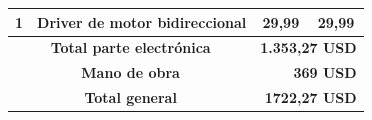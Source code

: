 \begin{appendices}
\begin{table}[t]
\begin{tabular}{clcc}
\multicolumn{1}{|c|}{1}                 & \multicolumn{1}{l|}{Driver de motor bidireccional}                      & \multicolumn{1}{c|}{29,99}              & \multicolumn{1}{c|}{29,99}              \\ \hline
\multicolumn{2}{|c|}{\textbf{Total parte electrónica}}                                                            & \multicolumn{2}{r|}{\textbf{1.353,27 USD}}                                        \\ \hline
\multicolumn{2}{|c|}{\textbf{Mano de obra}}                                                                       & \multicolumn{2}{r|}{\textbf{369 USD}}                                             \\ \hline
\multicolumn{2}{|c|}{\textbf{Total general}}                                                                      & \multicolumn{2}{r|}{\textbf{1722,27 USD}}                                         \\ \hline
\end{tabular}
\end{table}



\end{appendices}